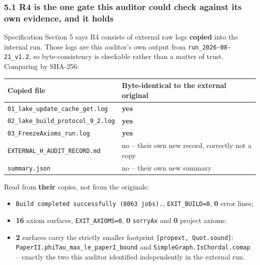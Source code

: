 \documentclass[
  10pt,
]{article}
\newcounter{none} %
\providecommand{\tightlist}{%
  \setlength{\itemsep}{0pt}\setlength{\parskip}{0pt}}
\begin{document}
\subsubsection{5.1 R4 is the one gate this auditor could check against
its own evidence, and it
holds}\label{r4-is-the-one-gate-this-auditor-could-check-against-its-own-evidence-and-it-holds}

Specification Section 5 says R4 consists of external raw logs
\textbf{copied} into the internal run. Those logs are this auditor's own
output from \texttt{run\_2026-08-21\_v1.2}, so byte-consistency is
checkable rather than a matter of trust. Comparing by SHA-256:

{\def\LTcaptype{none} %
\begin{longtable}[]{@{}
  >{\raggedright\arraybackslash}p{}
  >{\raggedright\arraybackslash}p{}@{}}
\toprule\noalign{}
\begin{minipage}[b]{\linewidth}\raggedright
Copied file
\end{minipage} & \begin{minipage}[b]{\linewidth}\raggedright
Byte-identical to the external original
\end{minipage} \\
\midrule\noalign{}
\endhead
\bottomrule\noalign{}
\endlastfoot
\texttt{01\_lake\_update\_cache\_get.log} & \textbf{yes} \\
\texttt{02\_lake\_build\_protocol\_9\_2.log} & \textbf{yes} \\
\texttt{03\_FreezeAxioms\_run.log} & \textbf{yes} \\
\texttt{EXTERNAL\_H\_AUDIT\_RECORD.md} & no -- their own new record,
correctly not a copy \\
\texttt{summary.json} & no -- their own new summary \\
\end{longtable}
}

Read from \textbf{their} copies, not from the originals:

\begin{itemize}
\tightlist
\item
  \texttt{Build\ completed\ successfully\ (8063\ jobs).},
  \texttt{EXIT\_BUILD=0}, \textbf{0} error lines;
\item
  \textbf{16} axiom surfaces, \texttt{EXIT\_AXIOMS=0}, \textbf{0}
  \texttt{sorryAx} and \textbf{0} project axioms;
\item
  \textbf{2} surfaces carry the strictly smaller footprint
  \texttt{{[}propext,\ Quot.sound{]}}:
  \texttt{PaperII.phiTau\_max\_le\_paperI\_bound} and
  \texttt{SimpleGraph.IsChordal.comap} -- exactly the two this auditor
  identified independently in the external run.
\end{itemize}
\end{document}
